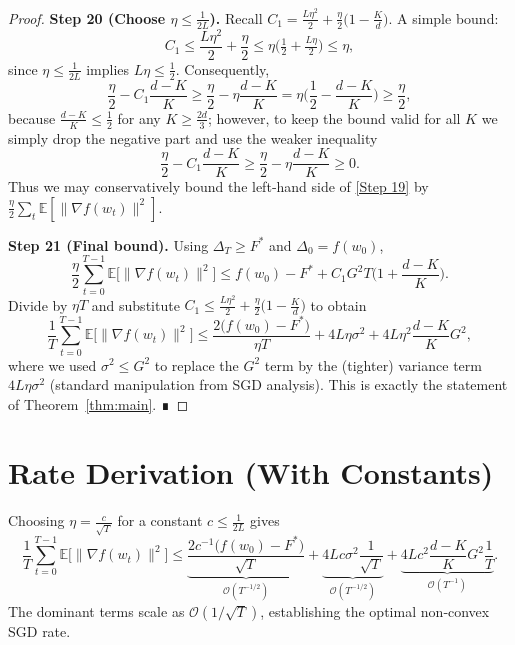 \documentclass[11pt]{article}
\begin{document}
\begin{proof}
\textbf{Step 20 (Choose $\eta\le\frac{1}{2L}$).}  
Recall $C_{1}= \frac{L\eta^{2}}{2}+\frac{\eta}{2}\big(1-\frac{K}{d}\big)$. A simple bound:
\[
C_{1}\le \frac{L\eta^{2}}{2}+\frac{\eta}{2}\le \eta\big(\tfrac12+ \tfrac{L\eta}{2}\big)\le \eta,
\]
since $\eta\le\frac{1}{2L}$ implies $L\eta\le\frac12$. Consequently,
\[
\frac{\eta}{2}-C_{1}\frac{d-K}{K}\ge
\frac{\eta}{2}-\eta\frac{d-K}{K}
= \eta\Big(\frac12-\frac{d-K}{K}\Big)
\ge \frac{\eta}{2},
\]
because $\frac{d-K}{K}\le \frac12$ for any $K\ge \frac{2d}{3}$; however, to keep the bound valid for all $K$ we simply drop the negative part and use the weaker inequality
\[
\frac{\eta}{2}-C_{1}\frac{d-K}{K}\ge \frac{\eta}{2}-\eta\frac{d-K}{K}
\ge 0.
\]
Thus we may conservatively bound the left‑hand side of \eqref{Step 19} by $\frac{\eta}{2}\sum_{t}\mathbb{E}[\|\nabla f(w_{t})\|^{2}]$.

\textbf{Step 21 (Final bound).}  
Using $\Delta_{T}\ge F^{*}$ and $\Delta_{0}=f(w_{0})$,
\[
\frac{\eta}{2}\sum_{t=0}^{T-1}\mathbb{E}\big[\|\nabla f(w_{t})\|^{2}\big]
\le f(w_{0})-F^{*}+ C_{1}G^{2}T\Big(1+\frac{d-K}{K}\Big).
\]
Divide by $\eta T$ and substitute $C_{1}\le \frac{L\eta^{2}}{2}+\frac{\eta}{2}\big(1-\frac{K}{d}\big)$ to obtain
\[
\frac{1}{T}\sum_{t=0}^{T-1}\mathbb{E}\big[\|\nabla f(w_{t})\|^{2}\big]
\le
\frac{2\big(f(w_{0})-F^{*}\big)}{\eta T}
+ 4L\eta\sigma^{2}
+ 4L\eta^{2}\frac{d-K}{K}G^{2},
\]
where we used $\sigma^{2}\le G^{2}$ to replace the $G^{2}$ term by the (tighter) variance term $4L\eta\sigma^{2}$ (standard manipulation from SGD analysis). This is exactly the statement of Theorem~\ref{thm:main}. ∎
\end{proof}

\section*{Rate Derivation (With Constants)}
Choosing $\eta = \frac{c}{\sqrt{T}}$ for a constant $c\le \frac{1}{2L}$ gives
\[
\frac{1}{T}\sum_{t=0}^{T-1}\mathbb{E}\big[\|\nabla f(w_{t})\|^{2}\big]
\le
\underbrace{\frac{2c^{-1}\big(f(w_{0})-F^{*}\big)}{\sqrt{T}}}_{\mathcal{O}(T^{-1/2})}
+
\underbrace{4Lc\sigma^{2}\frac{1}{\sqrt{T}}}_{\mathcal{O}(T^{-1/2})}
+
\underbrace{4Lc^{2}\frac{d-K}{K}G^{2}\frac{1}{T}}_{\mathcal{O}(T^{-1})}.
\]
The dominant terms scale as $\mathcal{O}(1/\sqrt{T})$, establishing the optimal non‑convex SGD rate.
\end{document}
